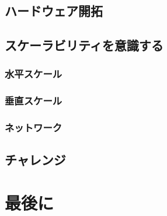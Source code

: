 \documentclass[dvipdfmx]{jsbook}
\begin{document}
\section{ハードウェア開拓}


\section{スケーラビリティを意識する}

\subsection{水平スケール}

\subsection{垂直スケール}

\subsection{ネットワーク}


\section{チャレンジ}

\clearpage

\chapter{最後に}


\clearpage
\begin{thebibliography}{9}
\end{thebibliography}
\end{document}
